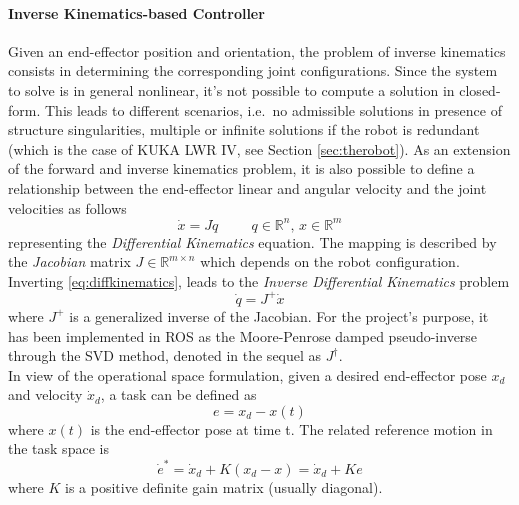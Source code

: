 \paragraph{Inverse Kinematics-based Controller}
Given an end-effector position and orientation, the problem of inverse kinematics consists in determining the corresponding joint configurations. Since the system to solve is in general nonlinear, it's not possible to compute a solution in closed-form. This leads to different scenarios, i.e.\ no admissible solutions in presence of structure singularities, multiple or infinite solutions if the robot is redundant (which is the case of KUKA LWR IV, see Section \ref{sec:therobot}). As an extension of the forward and inverse kinematics problem, it is also possible to define a relationship between the end-effector linear and angular velocity and the joint velocities as follows
\begin{equation}
\dot{x} = J\dot{q} \hspace{1cm} q \in \mathbb{R}^n,\,x \in \mathbb{R}^m
\label{eq:diffkinematics}
\end{equation}
representing the \textit{Differential Kinematics} equation. The mapping is described by the \textit{Jacobian} matrix $J \in \mathbb{R}^{m \times n}$ which depends on the robot configuration. Inverting \eqref{eq:diffkinematics}, leads to the \textit{Inverse Differential Kinematics} problem
\begin{equation}
\dot{q} = J^+\dot{x}
\end{equation}
where $J^+$ is a generalized inverse of the Jacobian. For the project's purpose, it has been implemented in ROS as the Moore-Penrose damped pseudo-inverse through the SVD method, denoted in the sequel as $J^{\dagger}$.\\
In view of the operational space formulation, given a desired end-effector pose $x_d$ and velocity $\dot{x}_d$, a task can be defined as 
\begin{equation}
e = x_d - x(t)
\end{equation}
where $x(t)$ is the end-effector pose at time t.
The related reference motion in the task space is
\begin{equation}
\dot{e}^* = \dot{x}_d + K(x_d - x) = \dot{x}_d + Ke
\end{equation}
where $K$ is a positive definite gain matrix (usually diagonal).

